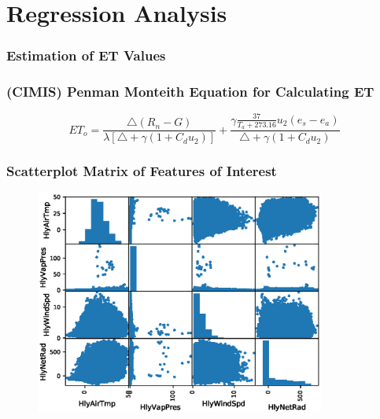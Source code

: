 \section{Regression Analysis}
\begin{frame}
\frametitle{Estimation of ET Values}
\end{frame}

\begin{frame}
\frametitle{(CIMIS) Penman Monteith Equation for Calculating ET}
\begin{equation*}
\boxed{ET_o = \frac{\bigtriangleup(R_n-G)}{\lambda[\bigtriangleup+\gamma(1+C_du_2)]} + \frac{\gamma\frac{37}{T_a+273.16}u_2(e_s-e_a)}{\bigtriangleup+\gamma(1+C_du_2)}}
\end{equation*}
\end{frame}

\begin{frame}
\frametitle{Scatterplot Matrix of Features of Interest}
\begin{figure}
\includegraphics[width=0.85\textwidth]{images/scatterplot-matrix-HlyAirTmp-HlyVapPres-HlyWindSpd-HlyNetRad}
\end{figure}
\end{frame}

